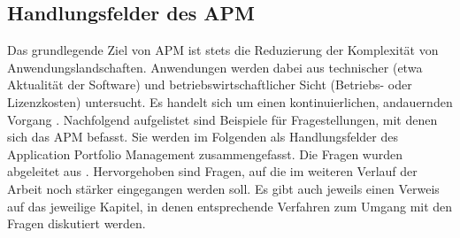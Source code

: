 \subsection {Handlungsfelder des APM}
Das grundlegende Ziel von APM ist stets die Reduzierung der Komplexität von Anwendungslandschaften. Anwendungen werden dabei aus technischer (etwa Aktualität der Software) und betriebswirtschaftlicher Sicht (Betriebs- oder Lizenzkosten) untersucht. Es handelt sich um einen kontinuierlichen, andauernden Vorgang \cite{schoder}. Nachfolgend aufgelistet sind Beispiele für Fragestellungen, mit denen sich das APM befasst. Sie werden im Folgenden als Handlungsfelder des Application Portfolio Management zusammengefasst. Die Fragen wurden abgeleitet aus \cite{apm}. Hervorgehoben sind Fragen, auf die im weiteren Verlauf der Arbeit noch stärker eingegangen werden soll. Es gibt auch jeweils einen Verweis auf das jeweilige Kapitel, in denen entsprechende Verfahren zum Umgang mit den Fragen diskutiert werden.

